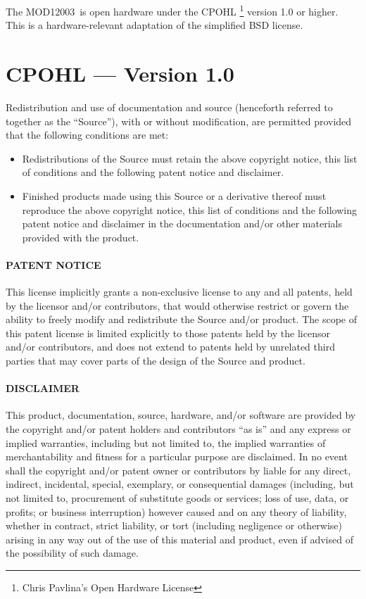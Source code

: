 \documentclass[letterpaper,twocolumn,10pt,openany,oneside,final,fleqn]{memoir}
\newcommand{\Model}{MOD12003\ }
\begin{document}
The \Model is open hardware under the CPOHL
\footnote{Chris Pavlina's Open Hardware License} version 1.0 or higher.
This is a hardware-relevant adaptation of the simplified BSD license.

\section{CPOHL --- Version 1.0}

Redistribution and use of documentation and source (henceforth referred
to together as the ``Source''), with or without modification, are
permitted provided that the following conditions are met:

\begin{itemize}
    \item{Redistributions of the Source must retain the above copyright
notice, this list of conditions and the following patent notice
and disclaimer.}
    \item{Finished products made using this Source or a derivative thereof
must reproduce the above copyright notice, this list of conditions
and the following patent notice and disclaimer in the
documentation and/or other materials provided with the product.}
\end{itemize}

\paragraph{PATENT NOTICE}
This license implicitly grants a non-exclusive license to any and all
patents, held by the licensor and/or contributors, that would otherwise
restrict or govern the ability to freely modify and redistribute the
Source and/or product.  The scope of this patent license is limited
explicitly to those patents held by the licensor and/or contributors,
and does not extend to patents held by unrelated third parties that may
cover parts of the design of the Source and product.

\paragraph{DISCLAIMER}
This product, documentation, source, hardware, and/or software are
provided by the copyright and/or patent holders and contributors ``as is''
and any express or implied warranties, including but not limited to, the
implied warranties of merchantability and fitness for a particular
purpose are disclaimed. In no event shall the copyright and/or patent
owner or contributors by liable for any direct, indirect, incidental,
special, exemplary, or consequential damages (including, but not limited
to, procurement of substitute goods or services; loss of use, data, or
profits; or business interruption) however caused and on any theory of
liability, whether in contract, strict liability, or tort (including
negligence or otherwise) arising in any way out of the use of this
material and product, even if advised of the possibility of such damage.
\end{document}

